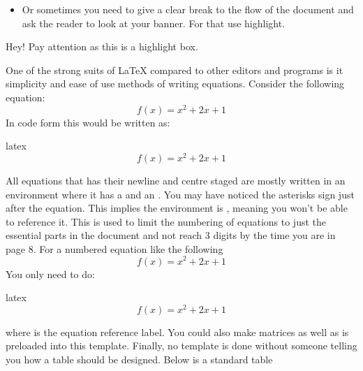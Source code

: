 \documentclass[minted, draw]{../tex/hebdomon}
\begin{document}
\begin{itemize}[leftmargin=!,labelindent=-29.2pt]
	\item[\pcode{highlight}] Or sometimes you need to give a clear break to the flow of the
	      document and ask the reader to look at your banner. For that use highlight.
\end{itemize}

\begin{highlight}
	Hey! Pay attention as this is a highlight box.
\end{highlight}

%
One of the strong suits of LaTeX compared to other editors and programs is
it simplicity and ease of use methods of writing equations. Consider the
following equation:
%
\begin{equation*}
	f(x) = x^2 + 2x + 1
\end{equation*}
%
In code form this would be written as:
%
\begin{code}{latex}
	\begin{equation*}
		f(x) = x^2 + 2x + 1
	\end{equation*}
\end{code}
%
All equations that has their newline and centre staged are mostly written
in an environment where it has a  and an . You may
have noticed the asterisks sign just after the equation. This implies the
environment is , meaning you won't be able to
reference it. This is used to limit the numbering of equations to just the
essential parts in the document and not reach 3 digits by the time you are
in page 8. For a numbered equation like the following
%
\begin{equation}
	f(x) = x^2 + 2x + 1
\end{equation}
%
You only need to do:
%
\begin{code}{latex}
	\begin{equation}\label{eq:quad}
		f(x) = x^2 + 2x + 1
	\end{equation}
\end{code}
% 
where \pcode{\label{eq:quad}} is the equation reference label.
%
You could also make matrices as well as  is preloaded into this template.
%
%
Finally, no template is done without someone telling you how a table should be designed.
%
Below is a standard table
%
\end{document}
